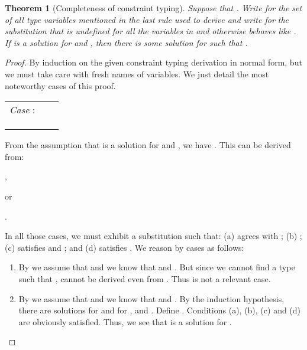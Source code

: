 \documentclass{eptcs}
\newcommand{\ih}{induction hypothesis\xspace}
\newtheorem{thm}{Theorem}[section]
\begin{document}
\begin{thm}[Completeness of constraint typing]
\label{thm:completeness}
Suppose that . Write  for
the set of all type variables mentioned in the last rule used to derive 
and write  for the substitution that is undefined for all the
variables in  and otherwise behaves like . If  is a
solution for  and , then
there is some solution  for
 such that .
\end{thm}
\begin{proof}
By induction on the given constraint typing derivation in normal form, but we
must take care with fresh names of variables. We just detail the most noteworthy cases of this
proof.

\begin{flushleft}
\begin{tabular}{lll}
        \textit{Case} :        & 
                                &                        \\
                                
                                &                   
                                &                                   \\
                                
                                & 
                                &        \\
                                
                                &  & \\
\end{tabular}
\end{flushleft}

From the assumption that  is a solution for  and , we have
. This can be derived from: 
\begin{inparaenum}[1)] 
\item ,
\item  or
\item . 
\end{inparaenum}
In all those cases, we must exhibit a substitution  such that: (a)  agrees with ; (b) ; (c) 
satisfies  and ; and (d)  satisfies . We reason by cases as follows:  

\begin{enumerate}
\item By  we assume that  and we know that
 and . But since we cannot find a
type  such that ,  cannot be derived even from . Thus  is not a relevant case.

\item By  we assume that  and we know that
 and . By the \ih, there are
solutions  for 
and  for , and
. Define . Conditions (a), (b), (c) and (d) are obviously satisfied. Thus, we
see that  is a solution for .


\end{enumerate}
\end{proof}
\end{document}

